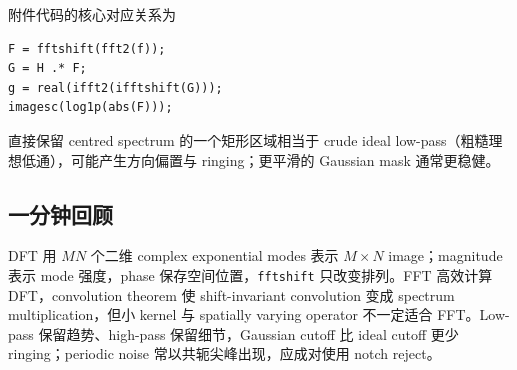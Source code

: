 附件代码的核心对应关系为
\begin{verbatim}
F = fftshift(fft2(f));
G = H .* F;
g = real(ifft2(ifftshift(G)));
imagesc(log1p(abs(F)));
\end{verbatim}
直接保留 centred spectrum 的一个矩形区域相当于 crude ideal low-pass（粗糙理想低通），可能产生方向偏置与 ringing；更平滑的 Gaussian mask 通常更稳健。

\subsection{一分钟回顾}

DFT 用 $MN$ 个二维 complex exponential modes 表示 $M\times N$ image；magnitude 表示 mode 强度，phase 保存空间位置，\texttt{fftshift} 只改变排列。FFT 高效计算 DFT，convolution theorem 使 shift-invariant convolution 变成 spectrum multiplication，但小 kernel 与 spatially varying operator 不一定适合 FFT。Low-pass 保留趋势、high-pass 保留细节，Gaussian cutoff 比 ideal cutoff 更少 ringing；periodic noise 常以共轭尖峰出现，应成对使用 notch reject。
